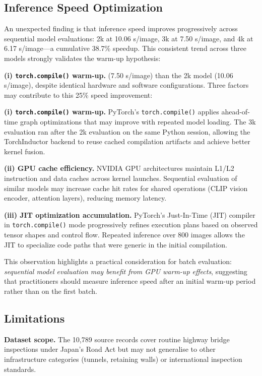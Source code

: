 \documentclass[twocolumn]{article}
\begin{document}
\subsection{Inference Speed Optimization}

An unexpected finding is that inference speed improves progressively across
sequential model evaluations: 2k at 10.06 s/image, 3k at 7.50 s/image, and
4k at 6.17 s/image---a cumulative 38.7\% speedup.
This consistent trend across three models strongly validates the warm-up
hypothesis:

\textbf{(i) \texttt{torch.compile()} warm-up.}
(7.50 s/image) than the 2k model (10.06 s/image), despite identical
hardware and software configurations.
Three factors may contribute to this 25\% speed improvement:

\textbf{(i) \texttt{torch.compile()} warm-up.}
PyTorch's \texttt{torch.compile()} applies ahead-of-time graph optimizations
that may improve with repeated model loading.
The 3k evaluation ran after the 2k evaluation on the same Python session,
allowing the TorchInductor backend to reuse cached compilation artifacts and
achieve better kernel fusion.

\textbf{(ii) GPU cache efficiency.}
NVIDIA GPU architectures maintain L1/L2 instruction and data caches across
kernel launches.
Sequential evaluation of similar models may increase cache hit rates for
shared operations (CLIP vision encoder, attention layers), reducing memory
latency.

\textbf{(iii) JIT optimization accumulation.}
PyTorch's Just-In-Time (JIT) compiler in \texttt{torch.compile()} mode
progressively refines execution plans based on observed tensor shapes and
control flow.
Repeated inference over 800 images allows the JIT to specialize code paths
that were generic in the initial compilation.

This observation highlights a practical consideration for batch evaluation:
\textit{sequential model evaluation may benefit from GPU warm-up effects},
suggesting that practitioners should measure inference speed after an initial
warm-up period rather than on the first batch.

\subsection{Limitations}

\textbf{Dataset scope.}
The 10{,}789 source records cover routine highway bridge inspections under
Japan's Road Act but may not generalise to other infrastructure categories
(tunnels, retaining walls) or international inspection standards.
\end{document}
